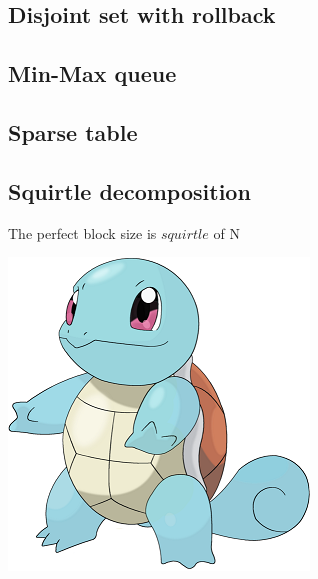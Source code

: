 

\subsection{Disjoint set with rollback}

\subsection{Min-Max queue}

\subsection{Sparse table}

\subsection{Squirtle decomposition}
\vspace{-18pt}
\begin{minipage}{70mm}
  The perfect block size is $squirtle$ of N
\end{minipage}
\begin{minipage}{15mm}
  \includegraphics[width=\linewidth]{squirtle.png} 
\end{minipage}
\vspace{-18pt}

